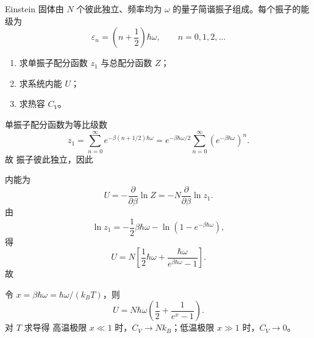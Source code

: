 \begin{question}
Einstein 固体由 $N$ 个彼此独立、频率均为 $\omega$ 的量子简谐振子组成。每个振子的能级为
\[
\varepsilon_n=\left(n+\frac12\right)\hbar\omega,\qquad n=0,1,2,\dots
\]

\begin{enumerate}[label=(\arabic*),leftmargin=2.5em]
  \item 求单振子配分函数 $z_1$ 与总配分函数 $Z$；
  \item 求系统内能 $U$；
  \item 求热容 $C_V$。
\end{enumerate}

\begin{solution}
单振子配分函数为等比级数
\[
z_1=\sum_{n=0}^{\infty}e^{-\beta(n+1/2)\hbar\omega}
=e^{-\beta\hbar\omega/2}\sum_{n=0}^{\infty}(e^{-\beta\hbar\omega})^n.
\]
故
振子彼此独立，因此

内能为
\[
U=-\frac{\partial}{\partial\beta}\ln Z
=-N\frac{\partial}{\partial\beta}\ln z_1.
\]
由
\[
\ln z_1=-\frac12\beta\hbar\omega-\ln(1-e^{-\beta\hbar\omega}),
\]
得
\[
U=N\left[\frac12\hbar\omega+\frac{\hbar\omega}{e^{\beta\hbar\omega}-1}\right].
\]
故

令 $x=\beta\hbar\omega=\hbar\omega/(k_B T)$，则
\[
U=N\hbar\omega\left(\frac12+\frac{1}{e^x-1}\right).
\]
对 $T$ 求导得
高温极限 $x\ll 1$ 时，$C_V\to Nk_B$；低温极限 $x\gg 1$ 时，$C_V\to 0$。
\end{solution}
\end{question}
